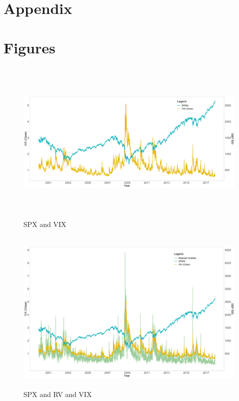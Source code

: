 \section*{Appendix}
\appendix
\section*{Figures}
%
\begin{figure}[!htbp]\caption{\ac{SPX} and VIX}\label{fig:SPandVIX}
\includegraphics[width=16cm, height=8cm]{pictures/SPandViX.png}
\end{figure}
%
\begin{figure}[!htbp]\caption{\ac{SPX} and RV and VIX}\label{fig:SPandVIXandVol}
\includegraphics[width=16cm, height=8cm]{pictures/SPandVolandViX.png}
\end{figure}

\newpage
